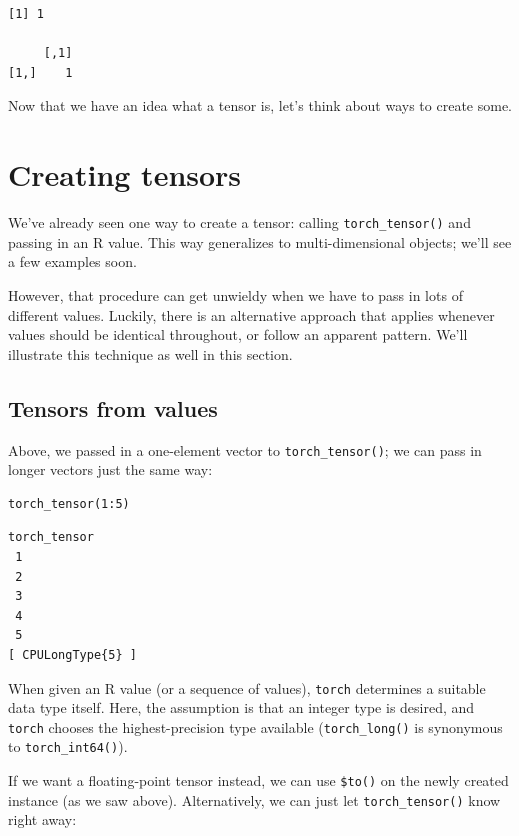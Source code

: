 \documentclass[
  letterpaper,
]{krantz}
\begin{document}
\begin{verbatim}
[1] 1

     [,1]
[1,]    1
\end{verbatim}

Now that we have an idea what a tensor is, let's think about ways to
create some.

\hypertarget{creating-tensors}{%
\section{Creating tensors}\label{creating-tensors}}

We've already seen one way to create a tensor: calling
\texttt{torch\_tensor()} and passing in an R value. This way generalizes
to multi-dimensional objects; we'll see a few examples soon.

However, that procedure can get unwieldy when we have to pass in lots of
different values. Luckily, there is an alternative approach that applies
whenever values should be identical throughout, or follow an apparent
pattern. We'll illustrate this technique as well in this section.

\hypertarget{tensors-from-values}{%
\subsection{\texorpdfstring{Tensors from
values}{Tensors from values}}\label{tensors-from-values}}

Above, we passed in a one-element vector to \texttt{torch\_tensor()}; we
can pass in longer vectors just the same way:

\begin{verbatim}
torch_tensor(1:5)
\end{verbatim}

\begin{verbatim}
torch_tensor
 1
 2
 3
 4
 5
[ CPULongType{5} ]
\end{verbatim}

When given an R value (or a sequence of values), \texttt{torch}
determines a suitable data type itself. Here, the assumption is that an
integer type is desired, and \texttt{torch} chooses the
highest-precision type available (\texttt{torch\_long()} is synonymous
to \texttt{torch\_int64()}).

If we want a floating-point tensor instead, we can use \texttt{\$to()}
on the newly created instance (as we saw above). Alternatively, we can
just let \texttt{torch\_tensor()} know right away:
\end{document}
